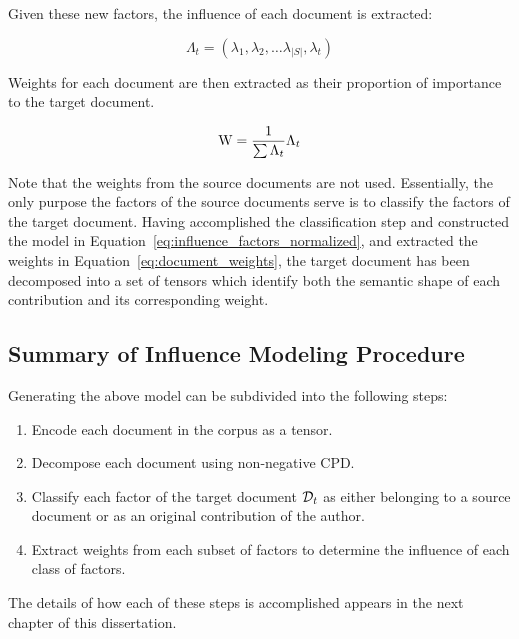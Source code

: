 \documentclass[../ut-dissertation.tex]{subfiles}
\begin{document}
Given these new factors, the influence of each document is extracted:

\begin{equation} \label{eq:document_lambda}
  \Lambda_t = (\lambda_1, \lambda_2, \ldots \lambda_{|S|}, \lambda_t)
\end{equation}

Weights for each document are then extracted as their proportion of
importance to the target document.

\begin{equation} \label{eq:document_weights}
  \mathrm{W} = \dfrac{1}{\sum \Lambda_t} \Lambda_t
\end{equation}

Note that the weights from the source documents are not used.
Essentially, the only purpose the factors of the source documents
serve is to classify the factors of the target document.  Having
accomplished the classification step and constructed the model in
Equation~\ref{eq:influence_factors_normalized}, and extracted the
weights in Equation~\ref{eq:document_weights}, the target document has
been decomposed into a set of tensors which identify both the semantic
shape of each contribution and its corresponding weight.

\subsection{Summary of Influence Modeling Procedure}
Generating the above model can be subdivided into the following steps:

\begin{enumerate}
\item Encode each document in the corpus as a tensor.
\item Decompose each document using non-negative CPD.
\item Classify each factor of the target document $\mathcal{D}_t$ as
  either belonging to a source document or as an original contribution
  of the author.
\item Extract weights from each subset of factors to determine the
  influence of each class of factors.
\end{enumerate}

The details of how each of these steps is accomplished appears in the
next chapter of this dissertation.
\end{document}
